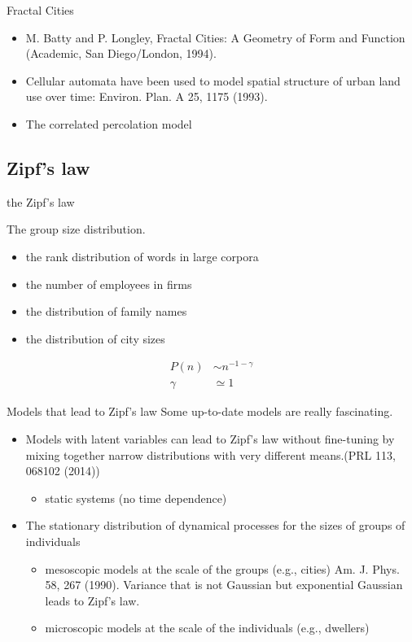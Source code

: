 \documentclass{beamer}
\begin{document}
\begin{frame}{Fractal Cities}
  \begin{itemize}
    \item M. Batty and P. Longley, Fractal Cities: A Geometry of Form
    and Function (Academic, San Diego/London, 1994).
    \item Cellular automata have been used to model spatial structure of urban land use over time: Environ. Plan. A 25, 1175 (1993).
    \item The correlated percolation model

  \end{itemize}
\end{frame}

\subsection{Zipf's law}

\begin{frame}{the Zipf's law}

  The group size distribution.
  \begin{itemize}
    \item the rank distribution of words in large corpora
    \item the number of employees in firms
    \item the distribution of family names
    \item the distribution of city sizes

  \end{itemize}

  \begin{align}
    P(n)&\sim n^{-1-\gamma}\\
    \gamma&\simeq 1
  \end{align}

\end{frame}

\begin{frame}{Models that lead to Zipf's law}
Some up-to-date models are really fascinating.
  \begin{itemize}
    \item Models with latent variables can lead to Zipf's law without fine-tuning by mixing together narrow distributions with very different means.(PRL 113, 068102 (2014))
    \begin{itemize}
      \item static systems (no time dependence)
    \end{itemize}
    \item The stationary distribution of dynamical processes for the sizes of groups of individuals
    \begin{itemize}
      \item mesoscopic models at the scale of the groups (e.g., cities) Am. J. Phys. 58, 267 (1990). Variance that is not Gaussian but exponential Gaussian leads to Zipf's law.
      \item microscopic models at the scale of the individuals (e.g., dwellers)
    \end{itemize}
  \end{itemize}

\end{frame}
\end{document}
